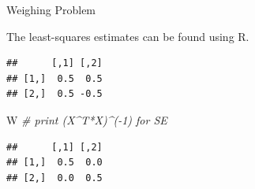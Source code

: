 \documentclass[9pt,ignorenonframetext,]{beamer}
\newenvironment{Shaded}{\begin{snugshade}}{\end{snugshade}}
\newcommand{\KeywordTok}[1]{\textcolor[rgb]{0.13,0.29,0.53}{\textbf{{#1}}}}
\newcommand{\DataTypeTok}[1]{\textcolor[rgb]{0.13,0.29,0.53}{{#1}}}
\newcommand{\DecValTok}[1]{\textcolor[rgb]{0.00,0.00,0.81}{{#1}}}
\newcommand{\StringTok}[1]{\textcolor[rgb]{0.31,0.60,0.02}{{#1}}}
\newcommand{\CommentTok}[1]{\textcolor[rgb]{0.56,0.35,0.01}{\textit{{#1}}}}
\newcommand{\NormalTok}[1]{{#1}}
\begin{document}
\begin{frame}[fragile]{Weighing Problem}

The least-squares estimates can be found using R.

\begin{Shaded}
\end{Shaded}

\begin{verbatim}
##      [,1] [,2]
## [1,]  0.5  0.5
## [2,]  0.5 -0.5
\end{verbatim}

\begin{Shaded}
\begin{Highlighting}[]
\NormalTok{W }\CommentTok{# print (X^T*X)^(-1) for SE }
\end{Highlighting}
\end{Shaded}

\begin{verbatim}
##      [,1] [,2]
## [1,]  0.5  0.0
## [2,]  0.0  0.5
\end{verbatim}

\end{frame}
\end{document}
